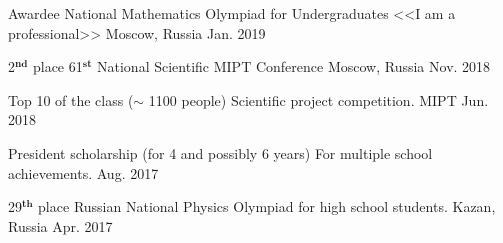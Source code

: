 \begin{cvhonors}
    
  \cvhonor
    {Awardee} %
    {National Mathematics Olympiad for Undergraduates <<I am a professional>>} %
    {Moscow, Russia} %
    {Jan. 2019} %
    
  \cvhonor
    {2$^{\textbf{nd}}$ place} %
    {61$^{\textbf{st}}$ National Scientific MIPT Conference} %
    {Moscow, Russia} %
    {Nov. 2018} %
    
  \cvhonor
    {Top 10 of the class ($\sim$ 1100 people)} %
    {Scientific project competition.} %
    {MIPT} %
    {Jun. 2018} %
    
  \cvhonor
    {President scholarship (for 4 and possibly 6 years)} %
    {For multiple school achievements.} %
    {} %
    {Aug. 2017} %

  \cvhonor
    {29$^{\textbf{th}}$ place} %
    {Russian National Physics Olympiad for high school students.} %
    {Kazan, Russia} %
    {Apr. 2017} %
	
\end{cvhonors}
